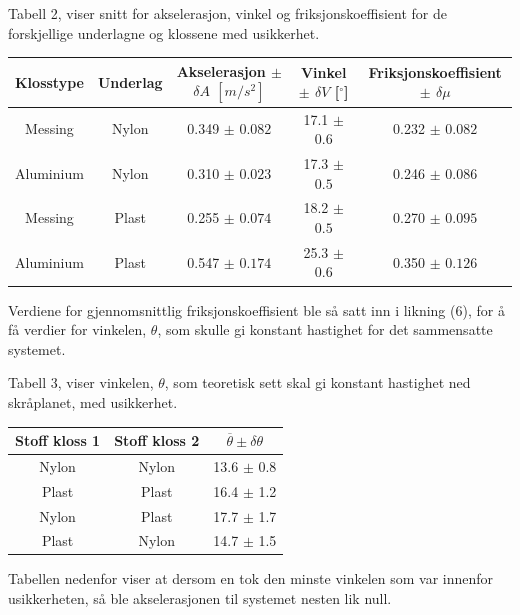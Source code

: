 \documentclass[10pt,a4paper]{report}
\begin{document}
\begin{center}
 \begin{tablenotes}
 	\small
 	\item Tabell 2, viser snitt for akselerasjon, vinkel og friksjonskoeffisient for de forskjellige underlagne og klossene med usikkerhet.
 	\end{tablenotes}
  \begin{tabular}{| c | c | c | c | c |}
    \hline
    Klosstype & Underlag & Akselerasjon $\pm$ $\delta A$ $[m/s^2]$ & Vinkel $\pm$ $\delta V$ [$^{\circ}$] & Friksjonskoeffisient $\pm$ $\delta \mu$ \\ \hline
    Messing & Nylon & 0.349 $\pm$ $0.082$ & 17.1 $\pm$ $0.6$ & 0.232 $\pm$ $0.082$ \\ \hline
    Aluminium & Nylon & 0.310 $\pm$ $0.023$ & 17.3 $\pm$ $0.5$ & 0.246 $\pm$ $0.086$\\ \hline
    Messing & Plast & 0.255 $\pm$ $0.074$ & 18.2 $\pm$ $0.5$ & 0.270 $\pm$ $0.095$\\ \hline
    Aluminium & Plast & 0.547 $\pm$ $0.174$ & 25.3 $\pm$ $0.6$ & 0.350 $\pm$ $0.126$\\ \hline
  \end{tabular}
\end{center}

Verdiene for gjennomsnittlig friksjonskoeffisient ble så satt inn i likning (6), for å få verdier for vinkelen, $\theta$, som skulle gi konstant hastighet for det sammensatte systemet.

\begin{center}
     \begin{tablenotes}
 	\small
 	\item Tabell 3, viser vinkelen, $\theta$, som teoretisk sett skal gi konstant hastighet ned skråplanet, med usikkerhet.
 	\end{tablenotes}
  \begin{tabular}{| c | c | c |}
    \hline
    Stoff kloss 1 & Stoff kloss 2 & $\overline{\theta} \pm \delta\theta$ \\ \hline
    Nylon & Nylon & 13.6 $\pm$ 0.8 \\ \hline
    Plast & Plast & 16.4 $\pm$ 1.2 \\ \hline
    Nylon & Plast & 17.7 $\pm$ 1.7 \\ \hline
    Plast & Nylon & 14.7 $\pm$ 1.5  \\ \hline
  \end{tabular}
\end{center}
Tabellen nedenfor viser at dersom en tok den minste vinkelen som var innenfor usikkerheten, så ble akselerasjonen til systemet nesten lik null.
\end{document}
